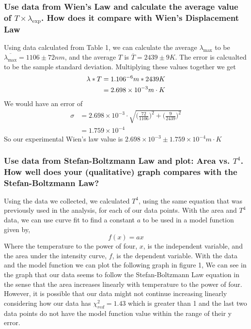 \documentclass{article}
\begin{document}
\subsubsection*{Use data from Wien's Law and calculate the average value of $T\times \lambda_{\exp}$.
How does it compare with Wien's Displacement Law}
Using data calculated from Table 1, we can calculate the average $\lambda_{\max}$
to be $\overline{\lambda_{\max}} = 1106 \pm 72 nm$, and the average $T$ is 
$\overline{T} = 2439 \pm 9 K$.
The error is calcualted to be the sample standard deviation. Multiplying these
values together we get
\begin{align*}
    \lambda * T &= 1.106\time 10^{-6}m * 2439 K\\
    &= 2.698 \times 10^{-3} m\cdot K
\end{align*}
We would have an error of
\begin{align*}
    \sigma &= 2.698 \times 10^{-3} \cdot \sqrt{\big(\frac{72}{1106}\big)^2 + 
    \big(\frac{9}{2439}\big)^2 }\\
    &= 1.759 \times 10^{-4}
\end{align*}
So our experimental Wien's law value is $2.698 \times 10^{-3} \pm 1.759 
\times 10^{-4} m\cdot K$

\subsubsection*{Use data from Stefan-Boltzmann Law and plot: Area vs. $T^4$. How 
well does your (qualitative) graph compares with the Stefan-Boltzmann Law?}
Using the data we collected, we calculated $T^4$, using the same equation that was 
previously used in the analysis, for each of our data points.  With the area and $T^4$
data, we can use curve fit to find a constant $a$ to be used in a model function given by,
\[f(x)=ax\] Where the temperature to the power of four, $x$, is the independent variable, 
and the area under the intensity curve, $f$, is the dependent variable.  With the data and 
the model function we can plot the following graph in figure 1,
We can see in the graph that our data seems to follow the Stefan-Boltzmann Law equation in 
the sense that the area increases linearly with temperature to the power of four.  However,
it is possible that our data might not continue increasing linearly considering how our data
has $\chi^2_{red}=1.43$ which is greater than 1 and the last two data points do not have 
the model function value within the range of their y error.
\end{document}
